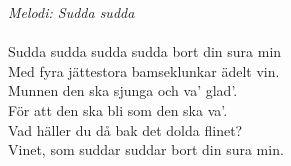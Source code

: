 {\footnotesize\textit{Melodi: Sudda sudda}}\\
\\
Sudda sudda sudda sudda bort din sura min\\
Med fyra jättestora bamseklunkar ädelt vin.\\
Munnen den ska sjunga och va' glad'.\\
För att den ska bli som den ska va'.\\
Vad häller du då bak det dolda flinet?\\
Vinet, som suddar suddar bort din sura min.
